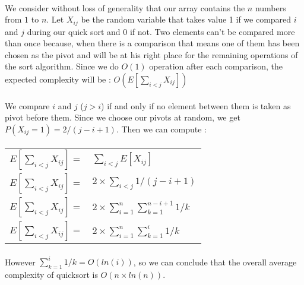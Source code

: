 \paragraph{}
We consider without loss of generality that our array contains the $n$ numbers from $1$ to $n$. Let $X_{ij}$ be the random variable that takes value 1 if we compared $i$ and $j$ during our quick sort and 0 if not. Two elements can't be compared more than once because, when there is a comparison that means one of them has been chosen as the pivot and will be at his right place for the remaining operations of the sort algorithm. Since we do $O(1)$ operation after each comparison, the expected complexity will be : $O(E[\sum_{i<j} X_{ij}])$

\paragraph{}
We compare $i$ and $j$ ($j>i$) if and only if no element between them is taken as pivot before them. Since we choose our pivots at random, we get $P(X_{ij}=1) = 2 / (j - i + 1)$. Then we can compute :
\paragraph{}
\begin{tabular}{rl}
$E[\sum_{i<j} X_{ij}] = $ & $ \sum_{i<j} E[X_{ij}] $ \\
$E[\sum_{i<j} X_{ij}] = $ & $ 2 \times \sum_{i<j} 1 / (j - i + 1) $ \\
$E[\sum_{i<j} X_{ij}] = $ & $ 2 \times \sum_{i=1}^{n} \sum_{k=1}^{n-i+1} 1 / k $ \\
$E[\sum_{i<j} X_{ij}] = $ & $ 2 \times \sum_{i=1}^{n} \sum_{k=1}^{i} 1 / k $ \\
\end{tabular}

\paragraph{}
However $\sum_{k=1}^{i} 1 / k = O(ln(i))$, so we can conclude that the overall average complexity of quicksort is $O(n \times ln(n))$.